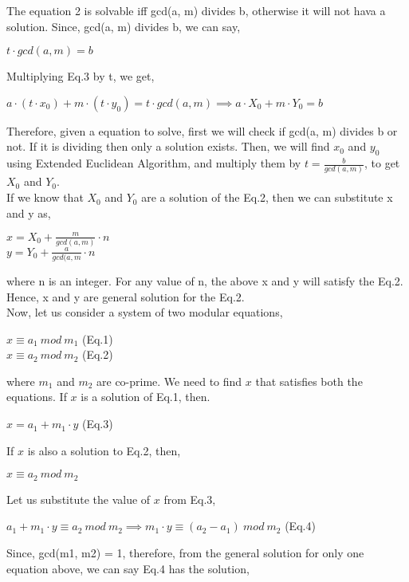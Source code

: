 \documentclass[11pt]{article}
\begin{document}
The equation 2 is solvable iff gcd(a, m) divides b, otherwise it will not hava a solution. Since, gcd(a, m) divides b, we can say,
\begin{center}
    $t \cdot gcd(a, m) = b$
\end{center}
Multiplying Eq.3 by t, we get, 
\begin{center}
    $a \cdot (t \cdot x_0) + m \cdot (t\cdot y_0) = t \cdot gcd(a, m) \implies a \cdot  X_0 + m \cdot Y_0 = b$
\end{center}

Therefore, given a equation to solve, first we will check if gcd(a, m) divides b or not. If it is dividing then only a solution exists. Then, we will find $x_0$ and $y_0$ using Extended Euclidean Algorithm, and multiply them by $t = \frac{b}{gcd(a, m)}$, to get $X_0$ and $Y_0$.\\
\newline
If we know that $X_0$ and $Y_0$ are a solution of the Eq.2, then we can substitute x and y as, 
\begin{center}
    $x = X_0 + \frac{m}{gcd(a, m)} \cdot n$\\
    \vspace{1mm}
    $y = Y_0 + \frac{a}{gcd(a, m} \cdot n$
\end{center}
where n is an integer. For any value of n, the above x and y will satisfy the Eq.2. Hence, x and y are general solution for the Eq.2.\\
\newline
Now, let us consider a system of two modular equations,
\begin{center}
    $x \equiv a_1 \ mod \ m_1$   (Eq.1)\\
    $x \equiv a_2 \ mod \ m_2$   (Eq.2)  
\end{center}
where $m_1$ and $m_2$ are co-prime. We need to find $x$ that satisfies both the equations. If $x$ is a solution of Eq.1, then.
\begin{center}
    $x = a_1 + m_1 \cdot y$  (Eq.3)
\end{center}
If $x$ is also a solution to Eq.2, then,
\begin{center}
    $x \equiv a_2 \ mod \ m_2$
\end{center}
Let us substitute the value of $x$ from Eq.3,
\begin{center}
    $a_1 + m_1 \cdot y \equiv a_2 \ mod \ m_2 \implies m_1 \cdot y \equiv (a_2 - a_1) \ mod \ m_2$   (Eq.4)
\end{center}
Since, gcd(m1, m2) = 1, therefore, from the general solution for only one equation above, we can say Eq.4 has the solution,
\end{document}
